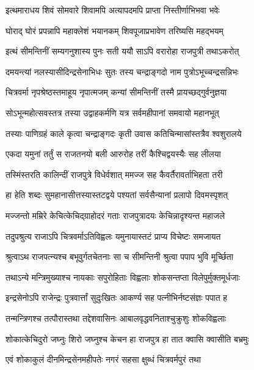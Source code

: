 \twolineshloka
{इत्थमाराधय शिवं सोमवारे शिवामपि}
{अत्यापदमपि प्राप्ता निस्तीर्णाभिभवा भवेः} %

\twolineshloka
{घोराद् घोरं प्रपन्नापि महाक्लेशं भयानकम्}
{शिवपूजाप्रभावेण तरिष्यसि महद्भयम्} %

\twolineshloka
{इत्थं सीमन्तिनीं सम्यगनुशास्य पुनः सती}
{ययौ साऽपि वरारोहा राजपुत्री तथाऽकरोत्} %

\twolineshloka
{दमयन्त्यां नलस्यासीदिन्द्रसेनाभिधः सुतः}
{तस्य चन्द्राङ्गदो नाम पुत्रोऽभूच्चन्द्रसन्निभः} %

\twolineshloka
{चित्रवर्मा नृपश्रेष्ठस्तमाहूय नृपात्मजम्}
{कन्यां सीमन्तिनीं तस्मै प्रायच्छद्गुर्वनुज्ञया} %

\twolineshloka
{सोऽभून्महोत्सवस्तत्र तस्या उद्वाहकर्मणि}
{यत्र सर्वमहीपानां समवायो महानभूत्} %

\twolineshloka
{तस्याः पाणिग्रहं काले कृत्वा चन्द्राङ्गदः कृती}
{उवास कतिचिन्मासांस्तत्रैव श्वशुरालये} %

\twolineshloka
{एकदा यमुनां तर्तुं स राजतनयो बली}
{आरुरोह तरीं कैश्चिद्वयस्यैः सह लीलया} %

\twolineshloka
{तस्मिंस्तरति कालिन्दीं राजपुत्रे विधेर्वशात्}
{ममज्ज सह कैवर्तैरावर्ताभिहता तरी} %

\twolineshloka
{हा हेति शब्दः सुमहानासीत्तस्यास्तटद्वये}
{पश्यतां सर्वसैन्यानां प्रलापो दिवमस्पृशत्} %

\twolineshloka
{मज्जन्तो मम्रिरे केचित्केचिद्ग्राहोदरं गताः}
{राजपुत्रादयः केचिन्नादृश्यन्त महाजले} %

\twolineshloka
{तदुपश्रुत्य राजाऽपि चित्रवर्माऽतिविह्वलः}
{यमुनायास्तटं प्राप्य विचेष्टः समजायत} %

\twolineshloka
{श्रुत्वाऽथ राजपत्न्यश्च बभूवुर्गतचेतनाः}
{सा च सीमन्तिनी श्रुत्वा पपाप भुवि मूर्च्छिता} %

\twolineshloka
{तथाऽन्ये मन्त्रिमुख्याश्च नायकाः सपुरोहिताः}
{विह्वलाः शोकसन्तप्ता विलेपुर्मुक्तमूर्धजाः} %

\twolineshloka
{इन्द्रसेनोऽपि राजेन्द्रः पुत्रवार्त्तां सुदुःखितः}
{आकर्ण्य सह पत्नीभिर्नष्टसंज्ञः पपात ह} %

\twolineshloka
{तन्मन्त्रिणश्च तत्पौरास्तथा तद्देशवासिनः}
{आबालवृद्धवनिताश्चुक्रुशुः शोकविह्वलाः} %

\twolineshloka
{शोकात्केचिदुरो जघ्नुः शिरो जघ्नुश्च केचन}
{हा राजपुत्र हा तात क्वासि क्वासीति बभ्रमुः} %

\twolineshloka
{एवं शोकाकुलं दीनमिन्द्रसेनमहीपतेः}
{नगरं सहसा क्षुब्धं चित्रवर्मपुरं तथा} %


